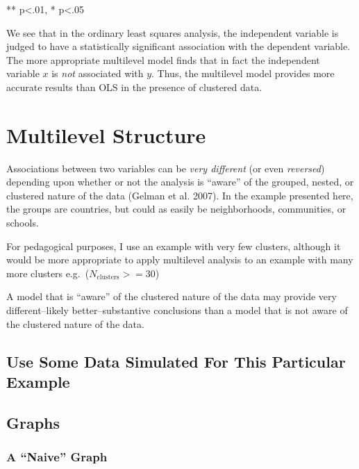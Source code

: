 \documentclass[
  letterpaper,
  DIV=11,
  numbers=noendperiod]{scrreprt}
\begin{document}
** p\textless.01, * p\textless.05

We see that in the ordinary least squares analysis, the independent
variable is judged to have a statistically significant association with
the dependent variable. The more appropriate multilevel model finds that
in fact the independent variable \(x\) is \emph{not} associated with
\(y\). Thus, the multilevel model provides more accurate results than
OLS in the presence of clustered data.

\hypertarget{sec-multilevelstructure}{%
\section{Multilevel Structure}\label{sec-multilevelstructure}}

Associations between two variables can be \emph{very different} (or even
\emph{reversed}) depending upon whether or not the analysis is ``aware''
of the grouped, nested, or clustered nature of the data (Gelman et al.
2007). In the example presented here, the groups are countries, but
could as easily be neighborhoods, communities, or schools.

For pedagogical purposes, I use an example with very few clusters,
although it would be more appropriate to apply multilevel analysis to an
example with many more clusters e.g.~(\(N_\text{clusters} >= 30\))

A model that is ``aware'' of the clustered nature of the data may
provide very different--likely better--substantive conclusions than a
model that is not aware of the clustered nature of the data.

\hypertarget{use-some-data-simulated-for-this-particular-example}{%
\subsection{Use Some Data Simulated For This Particular
Example}\label{use-some-data-simulated-for-this-particular-example}}

\hypertarget{graphs}{%
\subsection{Graphs}\label{graphs}}

\hypertarget{a-naive-graph}{%
\subsubsection{A ``Naive'' Graph}\label{a-naive-graph}}
\end{document}
